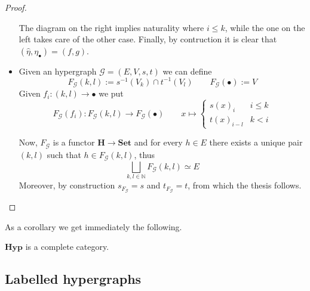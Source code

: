\documentclass[a4paper,UKenglish,cleveref,pdftex,thm-restate,numberwithinsect]{lipics-v2021}
\newcommand{\cat}[1]{\ensuremath{\mathbf{#1}}}
\newcommand{\hyp}{\cat{Hyp}}
\begin{document}
\begin{proof}
\begin{itemize}
\begin{center}
		\end{center}
		The diagram on the right implies naturality where $i\leq k$, while the one on the left takes care of the other case. Finally, by contruction it is clear that $(\hat{\eta}, \eta_{\bullet})=(f,g)$. 
		\item Given an hypergraph $\mathcal{G}=(E, V, s, t)$ we can define 
		\[F_{\mathcal{G}}(k,l):=s^{-1}(V_k)\cap t^{-1}(V_l) \qquad F_{\mathcal{G}}(\bullet):=V\]
		Given $f_i:(k,l)\to \bullet$ we put
		\[F_{\mathcal{G}}(f_i):F_{\mathcal{G}}(k,l)\to F_{\mathcal{G}}(\bullet) \qquad x\mapsto \begin{cases}
			s(x)_{i} & i\leq k\\
			t(x)_{i-l} &k <i
		\end{cases}  \]
		
		Now, $F_{\mathcal{G}}$ is a functor $\cat{H}\to \cat{Set}$ and for every $h\in E$ there exists a unique pair $(k,l)$ such that $h\in F_{\mathcal{G}}(k,l) $, thus
		\[\bigsqcup_{k,l\in \mathbb{N}}F_{\mathcal{G}}(k,l)\simeq E\]
		Moreover, by construction $s_{F_{\mathcal{G}}}=s$ and $t_{F_{\mathcal{G}}}=t$, from which the thesis follows. \qedhere
	\end{itemize}
\end{proof}
As a corollary we get immediately the following.
\begin{corollary}
	$\hyp$ is a complete category.
\end{corollary}

\subsection{Labelled hypergraphs}
\end{document}
